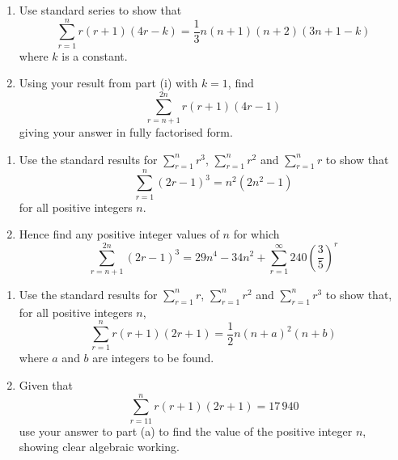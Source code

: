 \documentclass[leqno]{article}
\begin{document}
\begin{enumerate}[
  label=\textbf{\arabic*.},
  leftmargin=*,
  topsep=0pt,
  partopsep=0pt,
  parsep=0pt
]
\begin{enumerate}[label=\textbf{(\roman*)}]
  \item Use standard series to show that
  \[\sum_{r=1}^{n} r(r+1)(4r-k) = \dfrac{1}{3}n(n+1)(n+2)(3n+1-k)\]
  where $k$ is a constant.  \\
  \item Using your result from part (i) with $k=1$, find
  \[\sum_{r=n+1}^{2n} r(r+1)(4r-1)\]
  giving your answer in fully factorised form.  \\
\end{enumerate}

\newpage

\questionitem

\begin{enumerate}[label=\textbf{(\alph*)}]
  \item Use the standard results for $\sum_{r=1}^{n} r^3$, $\sum_{r=1}^{n} r^2$ and $\sum_{r=1}^{n} r$ to show that
  \[\sum_{r=1}^{n} (2r-1)^3 = n^2\left(2n^2 - 1\right)\]
  for all positive integers $n$.  \\
  \item Hence find any positive integer values of $n$ for which
  \[\sum_{r=n+1}^{2n} (2r-1)^3 = 29n^4 - 34n^2 + \sum_{r=1}^{\infty} 240\left(\dfrac{3}{5}\right)^{r}\] 
\end{enumerate}

\newpage

\questionitem

\begin{enumerate}[label=\textbf{(\alph*)}]
  \item Use the standard results for $\sum_{r=1}^{n} r$, $\sum_{r=1}^{n} r^2$ and $\sum_{r=1}^{n} r^3$ to show that, for all positive integers $n$,
  \[\sum_{r=1}^{n} r(r+1)(2r+1) = \dfrac{1}{2}n(n+a)^2(n+b)\]
  where $a$ and $b$ are integers to be found.  \\
  \item Given that
  \[\sum_{r=11}^{n} r(r+1)(2r+1) = 17\,940\]
  use your answer to part (a) to find the value of the positive integer $n$, showing clear algebraic working.  \\
\end{enumerate}

\newpage

\questionitem


\end{enumerate}
\end{document}
